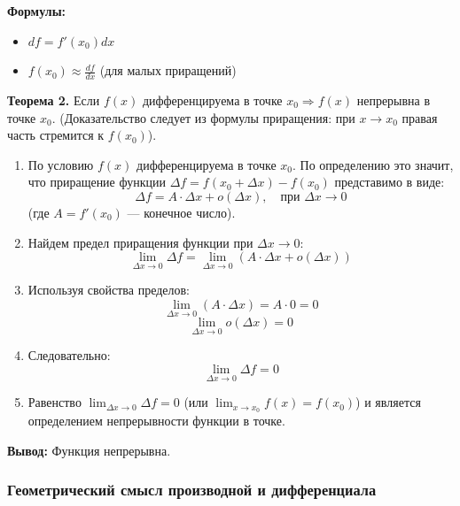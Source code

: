 \textbf{Формулы:}
\begin{itemize}
    \item $df = f'(x_0)dx$
    \item $f(x_0) \approx \frac{df}{dx}$ (для малых приращений)
\end{itemize}

\textbf{Теорема 2.} Если $f(x)$ дифференцируема в точке $x_0 \Rightarrow f(x)$ непрерывна в точке $x_0$.
(Доказательство следует из формулы приращения: при $x \to x_0$ правая часть стремится к $f(x_0)$).

\begin{tcolorbox}[title=Доказательство]
    \begin{enumerate}
        \item По условию $f(x)$ дифференцируема в точке $x_0$. По определению это значит, что приращение функции $\Delta f = f(x_0 + \Delta x) - f(x_0)$ представимо в виде:
        \[ \Delta f = A \cdot \Delta x + o(\Delta x), \quad \text{при } \Delta x \to 0 \]
        (где $A = f'(x_0)$ — конечное число).

        \item Найдем предел приращения функции при $\Delta x \to 0$:
        \[ \lim_{\Delta x \to 0} \Delta f = \lim_{\Delta x \to 0} \left( A \cdot \Delta x + o(\Delta x) \right) \]

        \item Используя свойства пределов:
        \[ \lim_{\Delta x \to 0} (A \cdot \Delta x) = A \cdot 0 = 0 \]
        \[ \lim_{\Delta x \to 0} o(\Delta x) = 0 \]
        
        \item Следовательно:
        \[ \lim_{\Delta x \to 0} \Delta f = 0 \]
        
        \item Равенство $\lim_{\Delta x \to 0} \Delta f = 0$ (или $\lim_{x \to x_0} f(x) = f(x_0)$) и является определением непрерывности функции в точке.
    \end{enumerate}
    \textbf{Вывод:} Функция непрерывна.
\end{tcolorbox}

\subsubsection*{Геометрический смысл производной и дифференциала}


